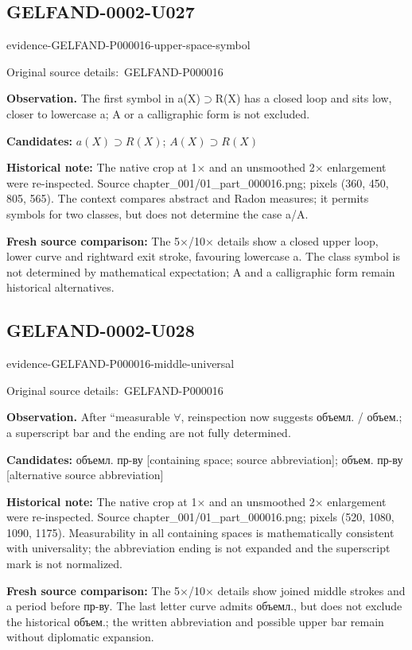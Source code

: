 \documentclass[11pt]{article}
\newcommand{\EvidenceBlock}[4]{%
 \par\smallskip\noindent\begin{minipage}{\linewidth}
 \begin{minipage}[t]{.47\linewidth}\vspace{0pt}\centering
 \csname evidence-#1-#2\endcsname\par
 {\scriptsize\SourceCropCaption\ #1}\par
 \end{minipage}\hfill
 \begin{minipage}[t]{.49\linewidth}\vspace{0pt}\raggedright
 {\small\color{orange!65!black}\textbf{#4} #3}\par
 \end{minipage}
 \end{minipage}\par\smallskip}
\newcommand{\SourceCropCaption}{Original source details:}\newcommand{\ReadingCaption}{Uncertain reading.}\newcommand{\IncompleteCaption}{Undeciphered passage.}\newcommand{\DiagramCaption}{Diagram and typed description.}
\begin{document}
\subsection*{GELFAND-0002-U027}
\EvidenceBlock{GELFAND-P000016}{upper-space-symbol}{The first symbol in a(X)\(\supset\)R(X) has a closed loop and sits low, closer to lowercase a; A or a calligraphic form is not excluded.}{Observation.}
\par\smallskip\noindent\textbf{Candidates: } \(a(X)\supset R(X)\); \(A(X)\supset R(X)\)\par
\par\smallskip\noindent\textbf{Historical note: } The native crop at 1× and an unsmoothed 2× enlargement were re-inspected. Source chapter\_001/01\_part\_000016.png; pixels (360, 450, 805, 565). The context compares abstract and Radon measures; it permits symbols for two classes, but does not determine the case a/A.\par
\par\smallskip\noindent\textbf{Fresh source comparison: } The 5×/10× details show a closed upper loop, lower curve and rightward exit stroke, favouring lowercase a. The class symbol is not determined by mathematical expectation; A and a calligraphic form remain historical alternatives.\par

\subsection*{GELFAND-0002-U028}
\EvidenceBlock{GELFAND-P000016}{middle-universal}{After ``measurable \(\forall\), reinspection now suggests объемл. / объем.; a superscript bar and the ending are not fully determined.}{Observation.}
\par\smallskip\noindent\textbf{Candidates: } объемл. пр-ву [containing space; source abbreviation]; объем. пр-ву [alternative source abbreviation]\par
\par\smallskip\noindent\textbf{Historical note: } The native crop at 1× and an unsmoothed 2× enlargement were re-inspected. Source chapter\_001/01\_part\_000016.png; pixels (520, 1080, 1090, 1175). Measurability in all containing spaces is mathematically consistent with universality; the abbreviation ending is not expanded and the superscript mark is not normalized.\par
\par\smallskip\noindent\textbf{Fresh source comparison: } The 5×/10× details show joined middle strokes and a period before пр-ву. The last letter curve admits объемл., but does not exclude the historical объем.; the written abbreviation and possible upper bar remain without diplomatic expansion.\par
\end{document}

